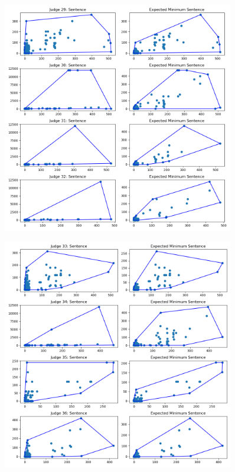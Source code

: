 \documentclass[11pt, oneside]{article}   	%
\theoremstyle{ModifiedStyle}
\begin{document}
			\begin{figure}[H]
				\centering
				\includegraphics[width=0.9\textwidth]{../../output/figures/Exploration/judge_convex_hulls_7.png}
			\end{figure}

			\begin{figure}[H]
				\centering
				\includegraphics[width=0.9\textwidth]{../../output/figures/Exploration/judge_convex_hulls_8.png}
			\end{figure}
\end{document}
